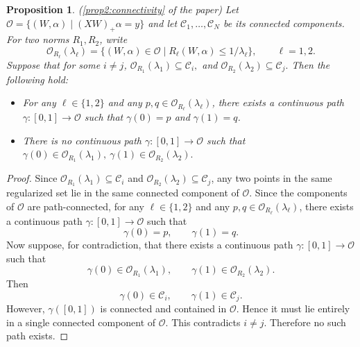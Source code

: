 \documentclass{article}
\newtheorem{proposition}{Proposition}[section]
\begin{document}
\begin{proposition}
(\cref{prop2:connectivity} of the paper)
Let
$\mathcal O=\{(W,\alpha)\mid (XW)_+\alpha=y\}$
and let \(\mathcal C_1,\ldots,\mathcal C_N\) be its connected components. For two norms \(R_1,R_2\), write
\[
\mathcal O_{R_\ell}(\lambda_\ell)
=
\{(W,\alpha)\in\mathcal O\mid R_\ell(W,\alpha)\le 1/\lambda_\ell\},
\qquad \ell=1,2.
\]
Suppose that for some \(i\neq j\),
$
\mathcal O_{R_1}(\lambda_1)\subseteq \mathcal C_i,
$
and
$
\mathcal O_{R_2}(\lambda_2)\subseteq \mathcal C_j.
$
Then the following hold:
\begin{itemize}[left=0pt]
    \item For any \(\ell \in \{1,2\}\) and any \(p,q \in \mathcal O_{R_\ell}(\lambda_\ell)\), there exists a continuous path \(\gamma:[0,1]\to \mathcal O\) such that \(\gamma(0)=p\) and \(\gamma(1)=q\).
    \item There is no continuous path \(\gamma:[0,1]\to \mathcal O\) such that
    $ \gamma(0)\in \mathcal O_{R_1}(\lambda_1),
    \ \gamma(1)\in \mathcal O_{R_2}(\lambda_2).$
\end{itemize}
\end{proposition}
\begin{proof}
Since \(\mathcal O_{R_1}(\lambda_1)\subseteq \mathcal C_i\) and
\(\mathcal O_{R_2}(\lambda_2)\subseteq \mathcal C_j\), any two points in the same
regularized set lie in the same connected component of \(\mathcal O\). Since the
components of \(\mathcal O\) are path-connected, for any
\(\ell\in\{1,2\}\) and any \(p,q\in \mathcal O_{R_\ell}(\lambda_\ell)\), there exists
a continuous path \(\gamma:[0,1]\to \mathcal O\) such that
\[
\gamma(0)=p,\qquad \gamma(1)=q.
\]
Now suppose, for contradiction, that there exists a continuous path
\(\gamma:[0,1]\to \mathcal O\) such that
\[
\gamma(0)\in \mathcal O_{R_1}(\lambda_1),
\qquad
\gamma(1)\in \mathcal O_{R_2}(\lambda_2).
\]
Then
\[
\gamma(0)\in \mathcal C_i,
\qquad
\gamma(1)\in \mathcal C_j.
\]
However, \(\gamma([0,1])\) is connected and contained in \(\mathcal O\). Hence it must
lie entirely in a single connected component of \(\mathcal O\). This contradicts
\(i\neq j\). Therefore no such path exists.
\end{proof}
\end{document}
